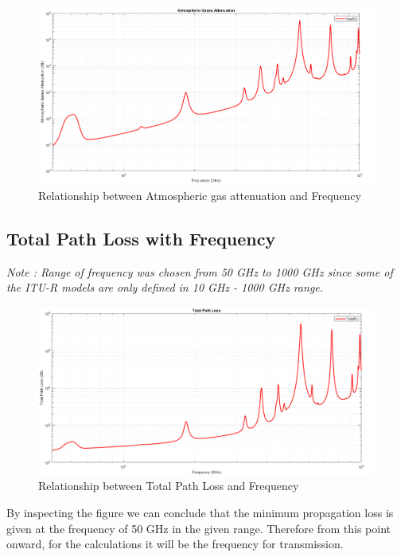 \documentclass[a4paper,11pt]{article}%
\begin{document}
\begin{figure}[!h]
	\centering
	\includegraphics[scale=0.35]{figures/GasPL.png}
	\caption{Relationship between Atmospheric gas attenuation and Frequency}
\end{figure}


\subsection{Total Path Loss with Frequency}
\textit{Note : Range of frequency was chosen from 50 GHz to 1000 GHz since some of the ITU-R models are only defined in 10 GHz - 1000 GHz range.}
\begin{figure}[!h]
	\centering
	\includegraphics[scale=0.35]{figures/TotalPL.png}
	\caption{Relationship between Total Path Loss and Frequency}
\end{figure}

By inspecting the figure we can conclude that the minimum propagation loss is given at the frequency of 50 GHz in the given range. Therefore from this point onward, for the calculations it will be the frequency for transmission.
\end{document}
